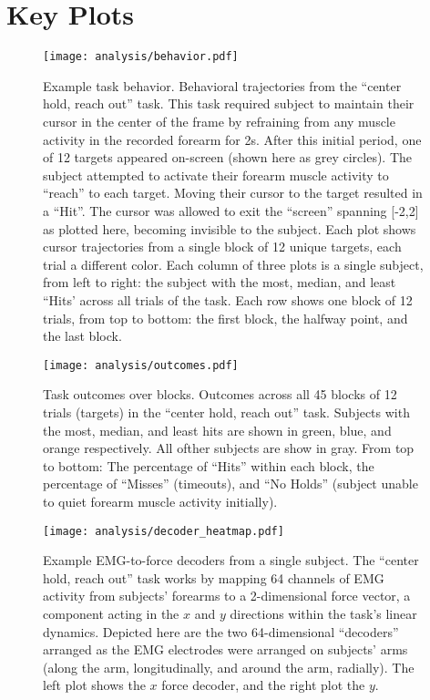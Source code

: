\documentclass[../main.tex]{subfiles}
\begin{document}
\section{Key Plots}\label{key-plots}

\begin{figure}
\centering
\texttt{[image: analysis/behavior.pdf]}
\caption{Example task behavior. Behavioral trajectories from the
``center hold, reach out'' task. This task required subject to maintain
their cursor in the center of the frame by refraining from any muscle
activity in the recorded forearm for 2s. After this initial period, one
of 12 targets appeared on-screen (shown here as grey circles). The
subject attempted to activate their forearm muscle activity to ``reach''    
to each target. Moving their cursor to the target resulted in a ``Hit''.
The cursor was allowed to exit the ``screen'' spanning {[}-2,2{]} as
plotted here, becoming invisible to the subject. Each plot shows cursor
trajectories from a single block of 12 unique targets, each trial a
different color. Each column of three plots is a single subject, from
left to right: the subject with the most, median, and least ``Hits'
across all trials of the task. Each row shows one block of 12 trials,
from top to bottom: the first block, the halfway point, and the last
block.}\label{fig:behavior}
\end{figure}

\begin{figure}
\centering
\texttt{[image: analysis/outcomes.pdf]}
\caption{Task outcomes over blocks. Outcomes across all 45 blocks of 12
trials (targets) in the ``center hold, reach out'' task. Subjects with
the most, median, and least hits are shown in green, blue, and orange
respectively. All ofther subjects are show in gray. From top to bottom:
The percentage of ``Hits'' within each block, the percentage of
``Misses'' (timeouts), and ``No Holds'' (subject unable to quiet forearm
muscle activity initially).}\label{fig:outcomes}
\end{figure}

\begin{figure}
\centering
\texttt{[image: analysis/decoder\_heatmap.pdf]}
\caption{Example EMG-to-force decoders from a single subject. The
``center hold, reach out'' task works by mapping 64 channels of EMG
activity from subjects' forearms to a 2-dimensional force vector, a
component acting in the \(x\) and \(y\) directions within the task's
linear dynamics. Depicted here are the two 64-dimensional ``decoders''
arranged as the EMG electrodes were arranged on subjects' arms (along
the arm, longitudinally, and around the arm, radially). The left plot
shows the \(x\) force decoder, and the right plot the
\(y\).}\label{fig:decoders}
\end{figure}
\end{document}
